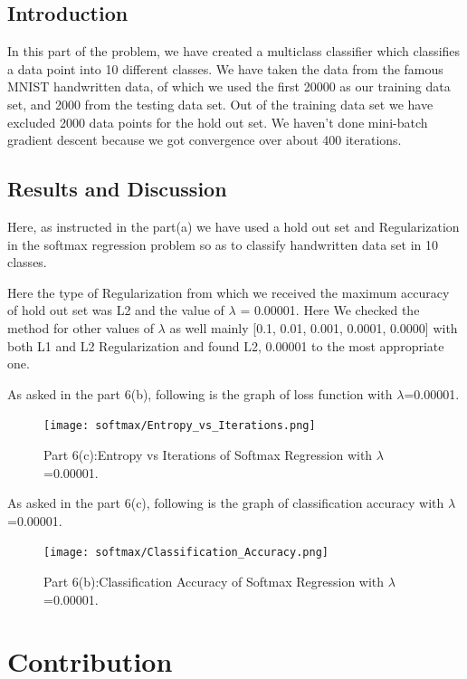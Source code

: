 \documentclass{article} %
\begin{document}
\subsection{Introduction}
In this part of the problem, we have created a multiclass classifier which classifies a data point into 10 different classes. We have taken the data from the famous MNIST handwritten data, of which we used the first 20000 as our training data set, and 2000 from the testing data set. Out of the training data set we have excluded 2000 data points for the hold out set. We haven't done mini-batch gradient descent because we got convergence over about 400 iterations.

\subsection{Results and Discussion}

Here, as instructed in the part(a) we have used a hold out set and Regularization in the softmax regression problem so as to classify handwritten data set in 10 classes.

Here the type of Regularization from which we received the maximum accuracy of hold out set was L2 and the value of $\lambda$ = 0.00001. Here We checked the method for other values of $\lambda$ as well mainly [0.1, 0.01, 0.001, 0.0001, 0.0000] with both L1 and L2 Regularization and found L2, 0.00001 to the most appropriate one.

As asked in the part 6(b), following is the graph of loss function with $\lambda$=0.00001.
\begin{figure}[H]
\begin{center}
\texttt{[image: softmax/Entropy\_vs\_Iterations.png]}
\end{center}
\caption{Part 6(c):Entropy vs Iterations of Softmax Regression with $\lambda$=0.00001.}
\end{figure}

As asked in the part 6(c), following is the graph of classification accuracy with $\lambda$=0.00001.

\begin{figure}[H]
\begin{center}
\texttt{[image: softmax/Classification\_Accuracy.png]}
\end{center}
\caption{Part 6(b):Classification Accuracy of Softmax Regression with $\lambda$=0.00001.}
\end{figure}

\section{Contribution}
\end{document}
